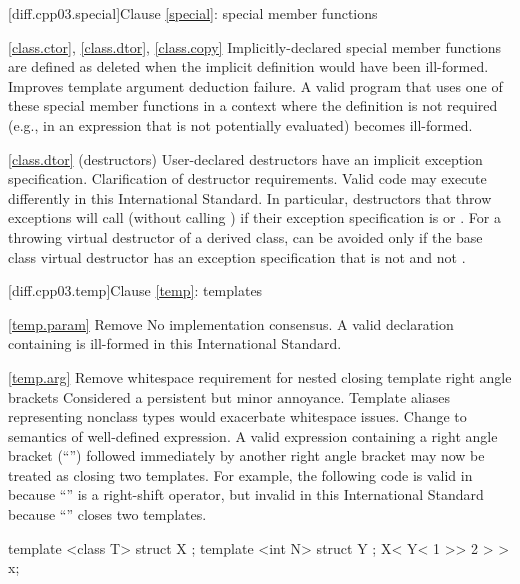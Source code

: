 [diff.cpp03.special]{Clause \ref{special}: special member functions}

\ref{class.ctor}, \ref{class.dtor}, \ref{class.copy}
\change Implicitly-declared special member functions are defined as deleted
when the implicit definition would have been ill-formed.
\rationale Improves template argument deduction failure.
\effect
A valid \CppIII program that uses one of these special member functions in a
context where the definition is not required (e.g., in an expression that is
not potentially evaluated) becomes ill-formed.

\ref{class.dtor} (destructors)
\change User-declared destructors have an implicit exception specification.
\rationale Clarification of destructor requirements.
\effect
Valid \CppIII code may execute differently in this International Standard. In
particular, destructors that throw exceptions will call 
(without calling ) if their exception specification is
 or . For a throwing virtual destructor
of a derived class,  can be avoided only if the base class
virtual destructor has an exception specification that is not 
and not .

[diff.cpp03.temp]{Clause \ref{temp}: templates}

\ref{temp.param}
\change Remove 
\rationale No implementation consensus.
\effect
A valid \CppIII declaration containing  is ill-formed in this
International Standard.

\ref{temp.arg}
\change Remove whitespace requirement for nested closing template right angle
brackets
\rationale Considered a persistent but minor annoyance. Template aliases
representing nonclass types would exacerbate whitespace issues.
\effect
Change to semantics of well-defined expression. A valid \CppIII expression
containing a right angle bracket (``\tcode{>}'') followed immediately by
another right angle bracket may now be treated as closing two templates.
For example, the following code is valid in \CppIII because ``\tcode{\shr}''
is a right-shift operator, but invalid in this International Standard because
``\tcode{\shr}'' closes two templates.

\begin{codeblock}
template <class T> struct X { };
template <int N> struct Y { };
X< Y< 1 >> 2 > > x;
\end{codeblock}

